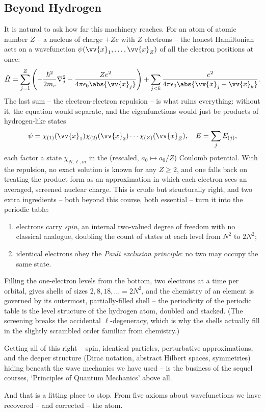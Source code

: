 \subsection{Beyond Hydrogen}

It is natural to ask how far this machinery reaches. For an atom of atomic number $Z$ -- a nucleus of charge $+Ze$ with $Z$ electrons -- the honest Hamiltonian acts on a wavefunction $\psi(\vv{x}_1, \dots, \vv{x}_Z)$ of all the electron positions at once:
$$
\hat{H} = \sum_{j=1}^{Z} \left( -\frac{\hbar^2}{2m_e}\nabla_j^2 - \frac{Z e^2}{4 \pi \epsilon_0 \abs{\vv{x}_j}} \right) + \sum_{j < k} \frac{e^2}{4\pi\epsilon_0 \abs{\vv{x}_j - \vv{x}_k}}.
$$
The last sum -- the electron-electron repulsion -- is what ruins everything: without it, the equation would separate, and the eigenfunctions would just be products of hydrogen-like states
$$
\psi = \chi_{(1)}(\vv{x}_1) \chi_{(2)}(\vv{x}_2) \cdots \chi_{(Z)}(\vv{x}_Z), \quad E = \sum_j E_{(j)},
$$
each factor a state $\chi_{N, \ell, m}$ in the (rescaled, $a_0 \mapsto a_0/Z$) Coulomb potential. With the repulsion, no exact solution is known for any $Z \geq 2$, and one falls back on treating the product form as an approximation in which each electron sees an averaged, screened nuclear charge. This is crude but structurally right, and two extra ingredients -- both beyond this course, both essential -- turn it into the periodic table:
\begin{enumerate}[label=(\roman*)]
    \item electrons carry \emph{spin}, an internal two-valued degree of freedom with no classical analogue, doubling the count of states at each level from $N^2$ to $2N^2$;
    \item identical electrons obey the \emph{Pauli exclusion principle}: no two may occupy the same state.
\end{enumerate}
Filling the one-electron levels from the bottom, two electrons at a time per orbital, gives shells of sizes $2, 8, 18, \dots = 2N^2$, and the chemistry of an element is governed by its outermost, partially-filled shell -- the periodicity of the periodic table is the level structure of the hydrogen atom, doubled and stacked. (The screening breaks the accidental $\ell$-degeneracy, which is why the shells actually fill in the slightly scrambled order familiar from chemistry.)

Getting all of this right -- spin, identical particles, perturbative approximations, and the deeper structure (Dirac notation, abstract Hilbert spaces, symmetries) hiding beneath the wave mechanics we have used -- is the business of the sequel courses, `Principles of Quantum Mechanics' above all.

And that is a fitting place to stop. From five axioms about wavefunctions we have recovered -- and corrected -- the atom.

